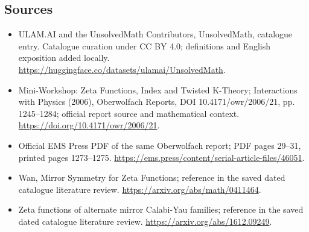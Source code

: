 \documentclass[11pt]{article}
\begin{document}
\subsection{Sources}
\begin{itemize}
\item[\hypertarget{source:statement:1}{S1}] ULAM.AI and the UnsolvedMath Contributors, UnsolvedMath, catalogue entry. Catalogue curation under CC BY 4.0; definitions and English exposition added locally.
\url{https://huggingface.co/datasets/ulamai/UnsolvedMath}.
\item[\hypertarget{source:statement:2}{S2}] Mini-Workshop: Zeta Functions, Index and Twisted K-Theory; Interactions with Physics (2006), Oberwolfach Reports, DOI 10.4171/owr/2006/21, pp. 1245--1284; official report source and mathematical context.
\url{https://doi.org/10.4171/owr/2006/21}.
\item[\hypertarget{source:statement:3}{S3}] Official EMS Press PDF of the same Oberwolfach report; PDF pages 29--31, printed pages 1273--1275.
\url{https://ems.press/content/serial-article-files/46051}.
\item[\hypertarget{source:statement:4}{S4}] Wan, Mirror Symmetry for Zeta Functions; reference in the saved dated catalogue literature review.
\url{https://arxiv.org/abs/math/0411464}.
\item[\hypertarget{source:statement:5}{S5}] Zeta functions of alternate mirror Calabi-Yau families; reference in the saved dated catalogue literature review.
\url{https://arxiv.org/abs/1612.09249}.
\end{itemize}
\label{end:statement}
\end{document}
